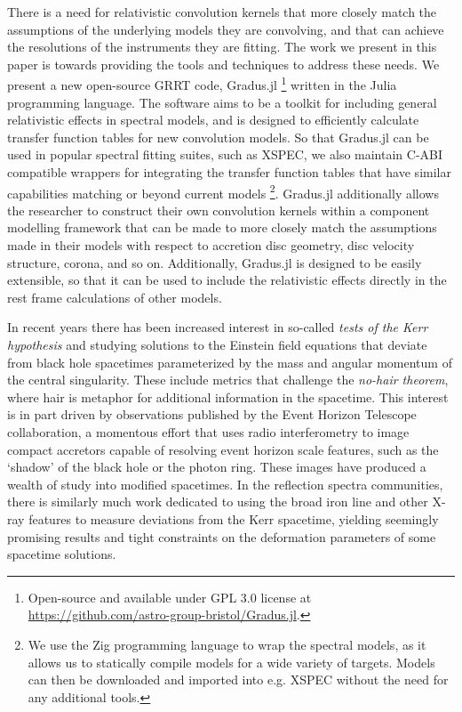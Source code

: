 \documentclass[fleqn,usenatbib]{mnras}
\newcommand{\Gradus}{Gradus.jl }
\begin{document}
There is a need for relativistic convolution kernels that more closely match the
assumptions of the underlying models they are convolving, and that can achieve
the resolutions of the instruments they are fitting.  The work we present in
this paper is towards providing the tools and techniques to address
these needs. We present a new open-source GRRT code,
\Gradus\footnote{Open-source and available under GPL 3.0 license at
\url{https://github.com/astro-group-bristol/Gradus.jl}.} written in the Julia
programming language. The software aims to be a toolkit for including general
relativistic effects in spectral models, and is designed to efficiently
calculate transfer function tables for new convolution models.  So that \Gradus
can be used in popular spectral fitting suites, such as XSPEC, we also maintain
C-ABI compatible wrappers for integrating the transfer function tables that have
similar capabilities matching or beyond current models \footnote{We use the Zig
    programming language to wrap the spectral models, as it allows us to
    statically compile models for a wide variety of targets. Models can then be
    downloaded and imported into e.g. XSPEC without the need for any additional
tools.}. \Gradus additionally allows the researcher to construct their own
convolution kernels within a component modelling framework that can be made to
more closely match the assumptions made in their models with respect to
accretion disc geometry, disc velocity structure, corona, and so on.
Additionally, \Gradus is designed to be easily extensible, so that it can be
used to include the relativistic effects directly in the rest frame calculations
of other models.

In recent years there has been increased interest in so-called \textit{tests of
the Kerr hypothesis} and studying solutions to the Einstein field equations that
deviate from black hole spacetimes parameterized by the mass and angular
momentum of the central singularity. These include metrics that challenge the
\textit{no-hair theorem}, where hair is metaphor for additional information in
the spacetime. This interest is in part driven by observations published by the
Event Horizon Telescope collaboration, a momentous effort that uses radio
interferometry to image compact accretors capable of resolving event horizon
scale features, such as the `shadow' of the black hole or the photon ring. These
images have produced a wealth of study into modified spacetimes. In the
reflection spectra communities, there is similarly much work dedicated to using
the broad iron line and other X-ray features to measure deviations from the Kerr
spacetime, yielding seemingly promising results and tight constraints on
the deformation parameters of some spacetime solutions.
\end{document}
